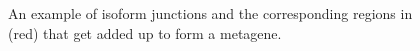 \begin{figure}
    \begin{center}
        
    \end{center}
    \caption{An example of isoform junctions and the corresponding regions in (red) that get added up to form a metagene.}
    \label{meta}
\end{figure}